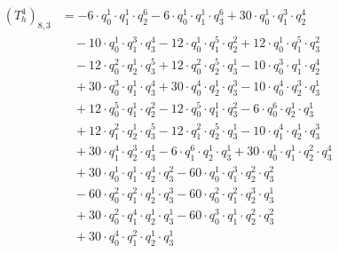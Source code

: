 \begin{align*}(T_{h}^4)_{8,3}&=-6\cdot q_0^{1}\cdot q_1^{1}\cdot q_2^{6}-6\cdot q_0^{1}\cdot q_1^{1}\cdot q_3^{6}+30\cdot q_0^{1}\cdot q_1^{3}\cdot q_2^{4}\\
&\quad -10\cdot q_0^{1}\cdot q_1^{3}\cdot q_3^{4}-12\cdot q_0^{1}\cdot q_1^{5}\cdot q_2^{2}+12\cdot q_0^{1}\cdot q_1^{5}\cdot q_3^{2}\\
&\quad -12\cdot q_0^{2}\cdot q_2^{1}\cdot q_3^{5}+12\cdot q_0^{2}\cdot q_2^{5}\cdot q_3^{1}-10\cdot q_0^{3}\cdot q_1^{1}\cdot q_2^{4}\\
&\quad +30\cdot q_0^{3}\cdot q_1^{1}\cdot q_3^{4}+30\cdot q_0^{4}\cdot q_2^{1}\cdot q_3^{3}-10\cdot q_0^{4}\cdot q_2^{3}\cdot q_3^{1}\\
&\quad +12\cdot q_0^{5}\cdot q_1^{1}\cdot q_2^{2}-12\cdot q_0^{5}\cdot q_1^{1}\cdot q_3^{2}-6\cdot q_0^{6}\cdot q_2^{1}\cdot q_3^{1}\\
&\quad +12\cdot q_1^{2}\cdot q_2^{1}\cdot q_3^{5}-12\cdot q_1^{2}\cdot q_2^{5}\cdot q_3^{1}-10\cdot q_1^{4}\cdot q_2^{1}\cdot q_3^{3}\\
&\quad +30\cdot q_1^{4}\cdot q_2^{3}\cdot q_3^{1}-6\cdot q_1^{6}\cdot q_2^{1}\cdot q_3^{1}+30\cdot q_0^{1}\cdot q_1^{1}\cdot q_2^{2}\cdot q_3^{4}\\
&\quad +30\cdot q_0^{1}\cdot q_1^{1}\cdot q_2^{4}\cdot q_3^{2}-60\cdot q_0^{1}\cdot q_1^{3}\cdot q_2^{2}\cdot q_3^{2}\\
&\quad -60\cdot q_0^{2}\cdot q_1^{2}\cdot q_2^{1}\cdot q_3^{3}-60\cdot q_0^{2}\cdot q_1^{2}\cdot q_2^{3}\cdot q_3^{1}\\
&\quad +30\cdot q_0^{2}\cdot q_1^{4}\cdot q_2^{1}\cdot q_3^{1}-60\cdot q_0^{3}\cdot q_1^{1}\cdot q_2^{2}\cdot q_3^{2}\\
&\quad +30\cdot q_0^{4}\cdot q_1^{2}\cdot q_2^{1}\cdot q_3^{1}\end{align*}
